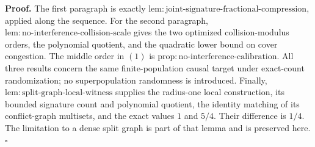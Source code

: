 \textbf{Proof.}
The first paragraph is exactly \(\mathrm{lem{:}joint\text{-}signature\text{-}fractional\text{-}compression}\), applied along the sequence. For the second paragraph, \(\mathrm{lem{:}no\text{-}interference\text{-}collision\text{-}scale}\) gives the two optimized collision-modulus orders, the polynomial quotient, and the quadratic lower bound on cover congestion. The middle order in \((1)\) is \(\mathrm{prop{:}no\text{-}interference\text{-}calibration}\). All three results concern the same finite-population causal target under exact-count randomization; no superpopulation randomness is introduced. Finally, \(\mathrm{lem{:}split\text{-}graph\text{-}local\text{-}witness}\) supplies the radius-one local construction, its bounded signature count and polynomial quotient, the identity matching of its conflict-graph multisets, and the exact values \(1\) and \(5/4\). Their difference is \(1/4\). The limitation to a dense split graph is part of that lemma and is preserved here. \(\square\)